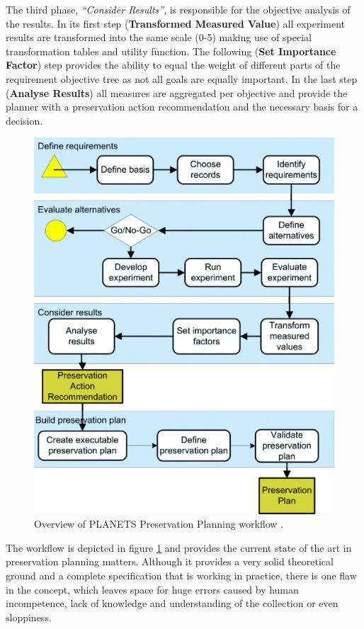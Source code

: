 The third phase, \textit{``Consider Results''}, is responsible for the objective analysis of the results. In its first step (\textbf{Transformed Measured Value}) all experiment results are transformed into the same scale (0-5) making use of special transformation tables and utility function. The following (\textbf{Set Importance Factor}) step provides the ability to equal the weight of different parts of the requirement objective tree as not all goals are equally important. In the last step (\textbf{Analyse Results}) all measures are aggregated per objective and provide the planner with a preservation action recommendation and the necessary basis for a decision.

\begin{figure}[htb]
\begin{center}
\includegraphics[width=4.5in]{figures/contentprofiling/planningworkflow.png}
\caption{Overview of PLANETS Preservation Planning workflow \cite{Becker:2008:PSO:1378889.1378954}.}
\label{fig:planningworkflow}
\end{center}
\end{figure}

The workflow is depicted in figure \ref{fig:planningworkflow} and provides the current state of the art in preservation planning matters. Although it provides a very solid theoretical ground and a complete specification that is working in practice, there is one flaw in the concept, which leaves space for huge errors caused by human incompetence, lack of knowledge and understanding of the collection or even sloppiness.

